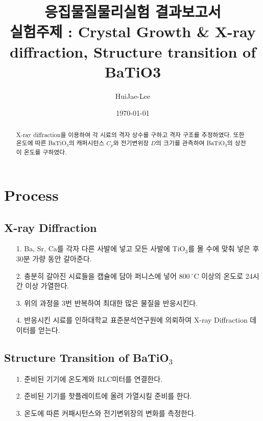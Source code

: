 \documentclass[aps,reprint,superscriptaddress,10pt]{revtex4-2}
\begin{document}
\title{응집물질물리실험 결과보고서 \\
\small 실험주제 : Crystal Growth \& X-ray diffraction,
Structure transition of BaTiO3}

\author{HuiJae-Lee}

\date{\today}

\begin{abstract}
  X-ray diffraction을 이용하여 각 시료의 격자 상수를 구하고 격자 구조를 추정하였다. 또한
  온도에 따른 BaTiO$_3$의 캐퍼시턴스 $C_p$와 전기변위장 $D$의 크기를 관측하여
  BaTiO$_3$의 상전이 온도를 구하였다.
\end{abstract}

\maketitle

\section{Process}
\subsection{X-ray Diffraction}
\begin{itemize}
  \item[1. ] Ba, Sr, Ca를 각자 다른 사발에 넣고 모든 사발에 TiO$_3$를 몰 수에 맞춰 넣은 후
  30분 가량 동안 갈아준다. 
  \item[2. ] 충분히 갈아진 시료들을 캡슐에 담아 퍼니스에 넣어 $800~\mathrm{^\circ C}$ 이상의
  온도로 24시간 이상 가열한다.
  \item[3. ] 위의 과정을 3번 반복하여 최대한 많은 물질을 반응시킨다.
  \item[4. ] 반응시킨 시료를 인하대학교 표준분석연구원에 의뢰하여  X-ray Diffraction 
  데이터를 얻는다.
\end{itemize}

\subsection{Structure Transition of BaTiO$_3$}
\begin{itemize}
  \item[1. ] 준비된 기기에 온도계와 RLC미터를 연결한다.
  \item[2. ] 준비된 기기를 핫플레이트에 올려 가열시킬 준비를 한다.
  \item[3. ] 온도에 따른 커패시턴스와 전기변위장의 변화를 측정한다.
\end{itemize}
\end{document}
